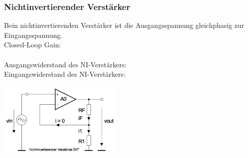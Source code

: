 		\subsubsection{Nichtinvertierender Verstärker }
			\begin{minipage}[T]{12cm}
            	Bein nichtinvertierenden Verstärker ist die Ausgangsspannung
            	gleichphasig zur Eingangsspannung.\\ Closed-Loop Gain:
            	\hspace{32mm}
            	\\
            	\hspace*{10mm}
            	\hspace{32mm}\\
            	Ausgangswiderstand des NI-Verstärkers: \\
            	Eingangswiderstand des NI-Verstärkers:
            	\hspace{1mm}
            \end{minipage}
			\begin{minipage}{6cm}
            	\includegraphics[width=6cm]{./bilder/ni-verstaerker.png}
            \end{minipage}\\

